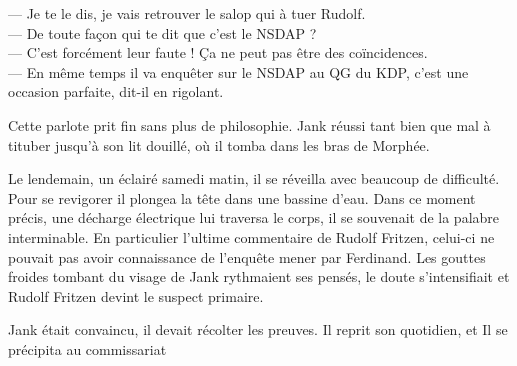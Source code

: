--- Je te le dis, je vais retrouver le salop qui à tuer Rudolf.\\
--- De toute façon qui te dit que c'est le NSDAP ?\\
--- C'est forcément leur faute ! Ça ne peut pas être des coïncidences.\\
--- En même temps il va enquêter sur le NSDAP au QG du KDP, c'est une occasion parfaite, dit-il en rigolant.

Cette parlote prit fin sans plus de philosophie.
Jank réussi tant bien que mal à tituber jusqu'à son lit douillé, où il tomba dans les bras de Morphée.

Le lendemain, un éclairé samedi matin, il se réveilla avec beaucoup de difficulté.
Pour se revigorer il plongea la tête dans une bassine d'eau. 
Dans ce moment précis, une décharge électrique lui traversa le corps, il se souvenait de la palabre interminable.
En particulier l'ultime commentaire de Rudolf Fritzen, celui-ci ne pouvait pas avoir connaissance de l'enquête mener par Ferdinand.
Les gouttes froides tombant du visage de Jank rythmaient ses pensés, le doute s'intensifiait et Rudolf Fritzen devint le suspect primaire.

Jank était convaincu, il devait récolter les preuves. 
Il reprit son quotidien, et 
Il se précipita au commissariat 

